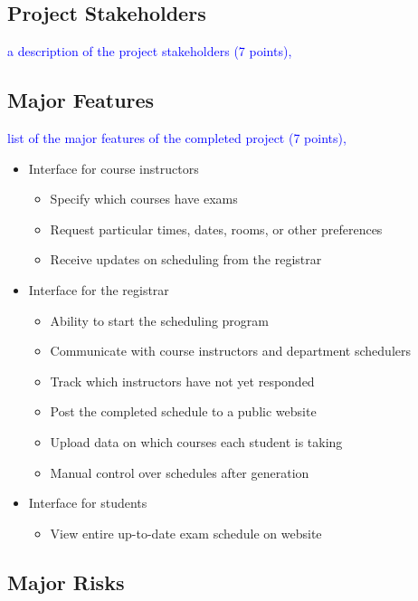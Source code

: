 \documentclass[11pt]{article}
\begin{document}
\subsection{Project Stakeholders} %
\textcolor{blue}{a description of the project stakeholders (7 points),}


\subsection{Major Features} %
\textcolor{blue}{ list of the major features of the completed project (7 points),}
\begin{itemize}
\item Interface for course instructors
  \begin{itemize}
  \item Specify which courses have exams
  \item Request particular times, dates, rooms, or other preferences
  \item Receive updates on scheduling from the registrar
  \end{itemize}
\item Interface for the registrar
  \begin{itemize}
  \item Ability to start the scheduling program
  \item Communicate with course instructors and department schedulers
  \item Track which instructors have not yet responded
  \item Post the completed schedule to a public website
  \item Upload data on which courses each student is taking %
  \item Manual control over schedules after generation
  \end{itemize}
\item Interface for students
  \begin{itemize}
  \item View entire up-to-date exam schedule on website
  \end{itemize}
\end{itemize}

\subsection{Major Risks} %
\end{document}
